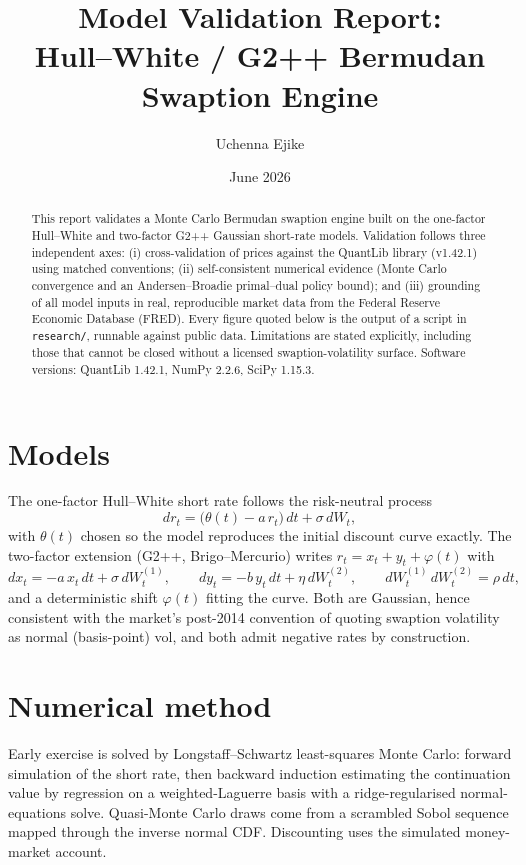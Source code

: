 \documentclass[11pt]{article}
\title{\textbf{Model Validation Report:\\ Hull--White / G2++ Bermudan Swaption Engine}}
\author{Uchenna Ejike}
\date{June 2026}
\begin{document}
\maketitle

\begin{abstract}
\noindent This report validates a Monte Carlo Bermudan swaption engine built on the
one-factor Hull--White and two-factor G2++ Gaussian short-rate models. Validation
follows three independent axes: (i) cross-validation of prices against the QuantLib
library (v1.42.1) using matched conventions; (ii) self-consistent numerical evidence
(Monte Carlo convergence and an Andersen--Broadie primal--dual policy bound); and
(iii) grounding of all model inputs in real, reproducible market data from the Federal
Reserve Economic Database (FRED). Every figure quoted below is the output of a script
in \texttt{research/}, runnable against public data. Limitations are stated explicitly,
including those that cannot be closed without a licensed swaption-volatility surface.
Software versions: QuantLib 1.42.1, NumPy 2.2.6, SciPy 1.15.3.
\end{abstract}

\section{Models}

The one-factor Hull--White short rate follows the risk-neutral process
\[
  dr_t = \big(\theta(t) - a\,r_t\big)\,dt + \sigma\,dW_t,
\]
with $\theta(t)$ chosen so the model reproduces the initial discount curve exactly. The
two-factor extension (G2++, Brigo--Mercurio) writes $r_t = x_t + y_t + \varphi(t)$ with
\[
  dx_t = -a\,x_t\,dt + \sigma\,dW_t^{(1)}, \qquad
  dy_t = -b\,y_t\,dt + \eta\,dW_t^{(2)}, \qquad
  dW_t^{(1)}\,dW_t^{(2)} = \rho\,dt,
\]
and a deterministic shift $\varphi(t)$ fitting the curve. Both are Gaussian, hence
consistent with the market's post-2014 convention of quoting swaption volatility as
normal (basis-point) vol, and both admit negative rates by construction.

\section{Numerical method}

Early exercise is solved by Longstaff--Schwartz least-squares Monte Carlo: forward
simulation of the short rate, then backward induction estimating the continuation value
by regression on a weighted-Laguerre basis with a ridge-regularised normal-equations
solve. Quasi-Monte Carlo draws come from a scrambled Sobol sequence mapped through the
inverse normal CDF. Discounting uses the simulated money-market account.
\end{document}
